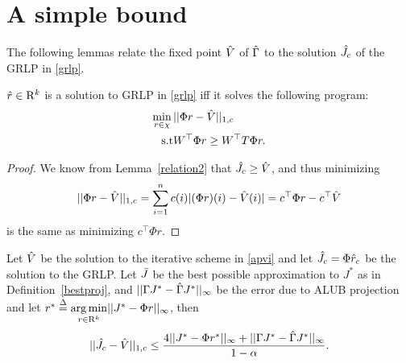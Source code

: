 \section{A simple bound}
The following lemmas relate the fixed point $\hat{V}$ of $\hat{\Gamma}$ to the solution $\hat{J}_c$ of the GRLP in \eqref{grlp}.
\begin{lemma}\label{srw}
$\hat{r} \in \mathrm{R}^k$ is a solution to GRLP in \eqref{grlp} iff it solves the following program:
\begin{align}\label{grlpeqprog}
\begin{split}
\min_{r\in \chi}\, &||\Phi r-\hv||_{1,c}\\
\text{s.t}\mb & W^\top \Phi r\geq W^\top T \Phi r.
\end{split}
\end{align}
\end{lemma}
\begin{proof}
We know from Lemma~\ref{relation2} that $\hat{J}_c\geq\hat{V}$, and thus minimizing 
\begin{align*}
||\Phi r-\hat{V}||_{1,c}=\sum_{i=1}^n c(i) |(\Phi r)(i)-\hat{V}(i)|=c^\top \Phi r-c^\top \hat{V}
\end{align*} 
is the same as minimizing $c^\top \Phi r$.
\end{proof}
\begin{theorem}\label{mt2}
Let $\hat{V}$ be the solution to the iterative scheme in \eqref{apvi} and let $\hat{J}_c=\Phi \hat{r}_c$ be the solution to the GRLP. Let $\bar{J}$ be the best possible approximation to $J^*$ as in Definition~\ref{bestproj}, and $||\Gamma J^* -\hat{\Gamma} J^*||_\infty$ be the error due to ALUB projection and let $r^*\stackrel{\Delta}{=}\underset{r\in \mathrm{R}^k}{\arg\min}||J^*-\Phi r||_\infty$, then
\begin{align}
||\hat{J}_c-\hat{V}||_{1,c}\leq\frac{4||J^*-\Phi r^*||_\infty+||\Gamma J^*-\hat{\Gamma} J^*||_\infty}{1-\alpha}.
\end{align}
\end{theorem}
